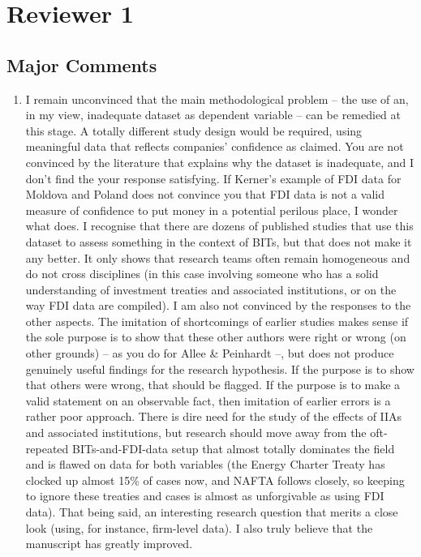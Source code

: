 \section{Reviewer 1}

\subsection{Major Comments}

\begin{enumerate}
	\item  I remain unconvinced that the main methodological problem -- the use of an, in my view, inadequate dataset as dependent variable -- can be remedied at this stage. A totally different study design would be required, using meaningful data that reflects companies' confidence as claimed. You are not convinced by the literature that explains why the dataset is inadequate, and I don't find the your response satisfying. If Kerner's example of FDI data for Moldova and Poland does not convince you that FDI data is not a valid measure of confidence to put money in a potential perilous place, I wonder what does. I recognise that there are dozens of published studies that use this dataset to assess something in the context of BITs, but that does not make it any better. It only shows that research teams often remain homogeneous and do not cross disciplines (in this case involving someone who has a solid understanding of investment treaties and associated institutions, or on the way FDI data are compiled). I am also not convinced by the responses to the other aspects. The imitation of shortcomings of earlier studies makes sense if the sole purpose is to show that these other authors were right or wrong (on other grounds) -- as you do for Allee \& Peinhardt --, but does not produce genuinely useful findings for the research hypothesis. If the purpose is to show that others were wrong, that should be flagged. If the purpose is to make a valid statement on an observable fact, then imitation of earlier errors is a rather poor approach. There is dire need for the study of the effects of IIAs and associated institutions, but research should move away from the oft-repeated BITs-and-FDI-data setup that almost totally dominates the field and is flawed on data for both variables (the Energy Charter Treaty has clocked up almost 15\% of cases now, and NAFTA follows closely, so keeping to ignore these treaties and cases is almost as unforgivable as using FDI data). That being said, an interesting research question that merits a close look (using, for instance, firm-level data). I also truly believe that the manuscript has greatly improved.

\end{enumerate}
